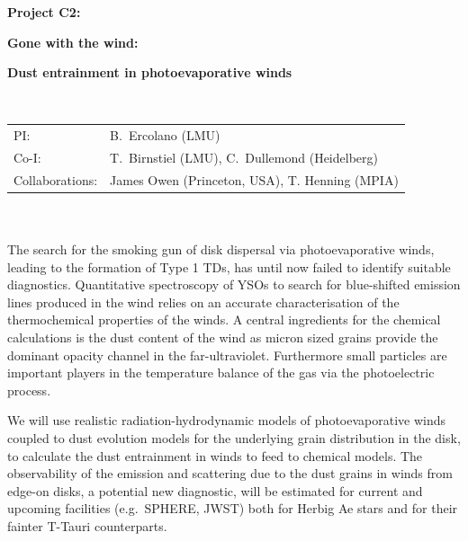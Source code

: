 \documentclass[10pt,fleqn,twoside]{article}
\begin{document}
\newpage


\setcounter{page}{1}

\centerline{\huge\bf\Tcol
%
%
%
%
%
 Project C2:}
\vspace{1em}

\centerline{\LARGE\bf\Tcol Gone with the wind:}\vspace{0.3em}
\centerline{\LARGE\bf\Tcol Dust entrainment in photoevaporative winds}

%
%
%
%
%
\vskip1.0cm


\\
\begin{tabular}{ll}
{\textsf{PI:}}                   & B.~Ercolano (LMU) \\
{\textsf{Co-I:}}                & T.~Birnstiel (LMU), C.~Dullemond (Heidelberg)\\
{\textsf{Collaborations:}}      &  James Owen (Princeton, USA),
                                    T. Henning (MPIA)\\

\end{tabular}


\vspace{1em}
 \\

\vspace{1em}
\\
The search for the smoking gun of disk dispersal via photoevaporative
winds, leading to the formation of Type 1 TDs,  has until
now failed to identify suitable diagnostics. Quantitative spectroscopy of
YSOs to search for blue-shifted emission lines produced in the wind
relies on an accurate characterisation of the thermochemical
properties of the winds. A central ingredients for the chemical
calculations is the dust content of the wind as micron sized grains
provide the dominant opacity channel in the far-ultraviolet.
Furthermore small particles are important players in the temperature
balance of the gas via the photoelectric process.  

We will use realistic radiation-hydrodynamic models of
photoevaporative winds coupled to dust evolution models for the
underlying grain distribution in the disk, to calculate the dust
entrainment in winds to feed to chemical models. The observability of
the emission and scattering due to the dust grains in winds from edge-on
disks, a potential new diagnostic, will be estimated for current and
upcoming facilities (e.g.\ SPHERE, JWST) both for Herbig
Ae stars and for their fainter T-Tauri counterparts.  
\end{document}
